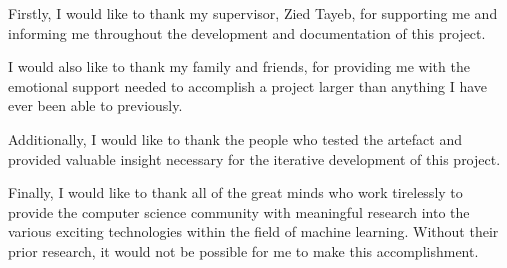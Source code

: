 \begin{acknowledgements}
Firstly, I would like to thank my supervisor, Zied Tayeb, for supporting me and informing me throughout the development and documentation of this project.

I would also like to thank my family and friends, for providing me with the emotional support needed to accomplish a project larger than anything I have ever been able to previously.

Additionally, I would like to thank the people who tested the artefact and provided valuable insight necessary for the iterative development of this project.

Finally, I would like to thank all of the great minds who work tirelessly to provide the computer science community with meaningful research into the various exciting technologies within the field of machine learning. Without their prior research, it would not be possible for me to make this accomplishment.
\end{acknowledgements}